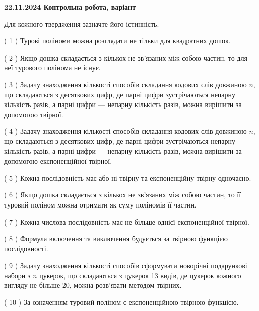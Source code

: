 \documentclass[12pt, ukrainian]{article}
\begin{document}
\vspace{4mm}
\newpage
\begin {large}

\textbf{22.11.2024 Контрольна робота, варіант  }\par


{
Для кожного твердження зазначте його істинність.\par
\vspace{2mm}
( 1 ) Турові поліноми можна розглядати не тільки для квадратних дошок.%

( 2 ) Якщо дошка складається з кількох не зв’язаних між собою частин, то для неї турового полінома не існує.%

( 3 ) Задачу знаходження кількості способів складання кодових слів довжиною $n$, що складаються з десяткових цифр, де парні цифри зустрічаються непарну кількість разів, а парні цифри — непарну кількість разів, можна вирішити за допомогою твірної.%

( 4 ) Задачу знаходження кількості способів складання кодових слів довжиною $n$, що складаються з десяткових цифр, де парні цифри зустрічаються непарну кількість разів, а парні цифри — непарну кількість разів, можна вирішити за допомогою експоненційної твірної.%

( 5 ) Кожна послідовність має або ні твірну та експоненційну твірну одночасно.%

( 6 ) Якщо дошка складається з кількох не зв’язаних між собою частин, то її туровий поліном можна отримати як суму поліномів її частин.%

( 7 ) Кожна числова послідовність має не більше однієї  експоненційної твірної.%

( 8 ) Формула включення та виключення будується за твірною функцією послідовності.%

( 9 ) Задачу знаходження кількості способів сформувати новорічні подарункові набори з $n$ цукерок, що складаються з цукерок 13 видів, де цукерок кожного вигляду не більше 20, можна розв’язати методом твірних.%

( 10 ) За означенням туровий поліном є експоненційною твірною функцією.%


\vspace{5mm}
}
\end {large}
\end{document}
